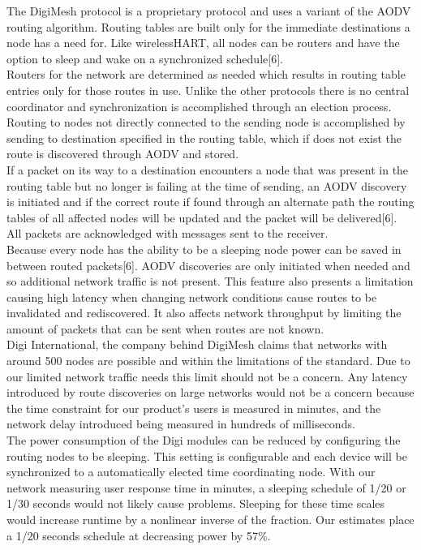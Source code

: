 \documentclass[journal]{IEEEtran}
\begin{document}
\noindent The DigiMesh protocol is a proprietary protocol and uses a variant of the AODV routing algorithm. Routing tables are built only for the immediate destinations a node has a need for.  Like wirelessHART, all nodes can be routers and have the option to sleep and wake on a synchronized schedule[6].\\

\noindent Routers for the network are determined as needed which results in routing table entries only for those routes in use. Unlike the other protocols there is no central coordinator and synchronization is accomplished through an election process.  Routing to nodes not directly connected to the sending node is accomplished by sending to destination specified in the routing table, which if does not exist the route is discovered through AODV and stored.\\

\noindent If a packet on its way to a destination encounters a node that was present in the routing table but no longer is failing at the time of sending, an AODV discovery is initiated and if the correct route if found through an alternate path the routing tables of all affected nodes will be updated and the packet will be delivered[6].  All packets are acknowledged with messages sent to the receiver.\\

\noindent Because every node has the ability to be a sleeping node power can be saved in between routed packets[6].  AODV discoveries are only initiated when needed and so additional network traffic is not present.  This feature also presents a limitation causing high latency when changing network conditions cause routes to be invalidated and rediscovered. It also affects network throughput by limiting the amount of packets that can be sent when routes are not known.\\

\noindent Digi International, the company behind DigiMesh claims that networks with around 500 nodes are possible and within the limitations of the standard.  Due to our limited network traffic needs this limit should not be a concern.  Any latency introduced by route discoveries on large networks would not be a concern because the time constraint for our product’s users is measured in minutes, and the network delay introduced being measured in hundreds of milliseconds.\\

\noindent The power consumption of the Digi modules can be reduced by configuring the routing nodes to be sleeping.  This setting is configurable and each device will be synchronized to a automatically elected time coordinating node.  With our network measuring user response time in minutes, a sleeping schedule of 1/20 or 1/30 seconds would not likely cause problems.  Sleeping for these time scales would increase runtime by a nonlinear inverse of the fraction. Our estimates place a 1/20 seconds schedule at decreasing power by 57\%.\\
\end{document}
